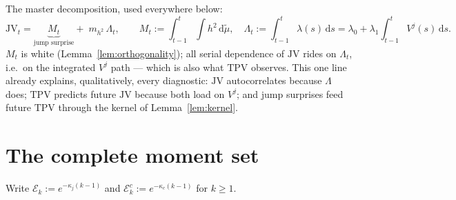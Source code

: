 \documentclass[11pt]{report}
\theoremstyle{definition}
\theoremstyle{remark}
\newcommand{\dd}{\,\mathrm{d}}
\newcommand{\Vj}{V^{j}}
\newcommand{\TPV}{\mathrm{TPV}}
\newcommand{\JV}{\mathrm{JV}}
\newcommand{\mh}{m_{h^{2}}}
\begin{document}
The master decomposition, used everywhere below:
\begin{equation}\label{eq:jvdecomp}
\JV_{t}
=\underbrace{M_{t}}_{\text{jump surprise}}
+\;\mh\,\Lambda_{t},
\qquad
M_{t}:=\int_{t-1}^{t}\!\!\int h^{2}\dd\tilde\mu,
\quad
\Lambda_{t}:=\int_{t-1}^{t}\!\lambda(s)\dd s
=\lambda_{0}+\lambda_{1}\!\!\int_{t-1}^{t}\!\!\Vj(s)\dd s .
\end{equation}
$M_{t}$ is white (Lemma~\ref{lem:orthogonality}); all serial dependence of
$\JV$ rides on $\Lambda_{t}$, i.e.\ on the integrated $\Vj$ path --- which is
also what $\TPV$ observes. This one line already explains, qualitatively,
every diagnostic: $\JV$ autocorrelates because $\Lambda$ does; $\TPV$
predicts future $\JV$ because both load on $\Vj$; and jump surprises feed
future $\TPV$ through the kernel of Lemma~\ref{lem:kernel}.

\section{The complete moment set}

Write $\mathcal{E}_{k}:=e^{-\kappa_{j}(k-1)}$ and
$\mathcal{E}^{c}_{k}:=e^{-\kappa_{c}(k-1)}$ for $k\ge 1$.
\end{document}
